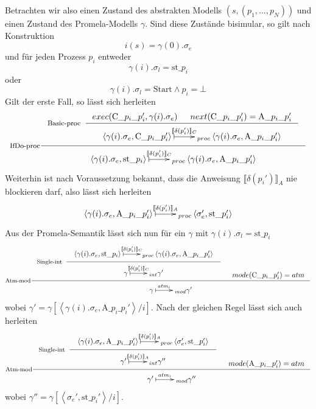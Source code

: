 Betrachten wir also einen Zustand des abstrakten Modells $(s,(p_1,\dots,p_N))$ und einen Zustand des Promela-Modells $\gamma$.
Sind diese Zustände bisimular, so gilt nach Konstruktion
\[ i(s) = \gamma(0).\sigma_e \]
und für jeden Prozess $p_i$ entweder
\[ \gamma(i).\sigma_l = \textrm{st\_}p_i \]
oder
\[ \gamma(i).\sigma_l = \textrm{Start} \land p_i = \bot \]
Gilt der erste Fall, so lässt sich herleiten
\[ \inference[IfDo-proc]{
  \inference[Basic-proc]{exec(\textrm{C\_}p_i\textrm{\_}p_i',\gamma(i).\sigma_e) & next(\textrm{C\_}p_i\textrm{\_}p_i') = \textrm{A\_}p_i\textrm{\_}p_i'}{
  \xymatrix{ \left<\gamma(i).\sigma_e,\textrm{C\_}p_i\textrm{\_}p_i'\right>\ar@{|->}[r]^-{\llbracket \delta(p_i')\rrbracket_C} & _{proc}
    \left<\gamma(i).\sigma_e,\textrm{A\_}p_i\textrm{\_}p_i'\right>}
  }
  }
  { \xymatrix{ \left<\gamma(i).\sigma_e,\textrm{st\_}p_i\right> \ar@{|->}[r]^-{\llbracket \delta(p_i')\rrbracket_C} & _{proc}
      \left<\gamma(i).\sigma_e,\textrm{A\_}p_i\textrm{\_}p_i'\right>}
  }
\]
Weiterhin ist nach Voraussetzung bekannt, dass die Anweisung $\llbracket \delta(p_i')\rrbracket_A$ nie blockieren darf, also lässt sich herleiten
\[
  \xymatrix{ \left<\gamma(i).\sigma_e,\textrm{A\_}p_i\textrm{\_}p_i'\right> \ar@{|->}[r]^-{\llbracket \delta(p_i')\rrbracket_A} & _{proc}
    \left<\sigma_e',\textrm{st\_}p_i'\right> }
\]
Aus der Promela-Semantik lässt sich nun für ein $\gamma$ mit $\gamma(i).\sigma_l = \textrm{st\_}p_i$
\[
\inference[Atm-mod]{
  \inference[Single-int]{
    \xymatrix{ \left<\gamma(i).\sigma_e,\textrm{st\_}p_i\right> \ar@{|->}[r]^-{\llbracket \delta(p_i')\rrbracket_C} & _{proc}
      \left<\gamma(i).\sigma_e,\textrm{A\_}p_i\textrm{\_}p_i'\right> }
  }{
    \xymatrix{ \gamma \ar@{|->}[r]^-{\llbracket \delta(p_i')\rrbracket_C} & _{int}
      \gamma'
    }
  } & mode(\textrm{C\_}p_i\textrm{\_}p_i') = atm
}{
  \xymatrix{ \gamma \ar@{|->}[r]^-{atm_i} & _{mod}
    \gamma'
  }
}
\]
wobei $\gamma' = \gamma[\left<\gamma(i).\sigma_e,\textrm{A\_}p_i\textrm{\_}p_i'\right>/i]$.
Nach der gleichen Regel lässt sich auch herleiten
\[
\inference[Atm-mod]{
  \inference[Single-int]{
    \xymatrix{ \left<\gamma(i).\sigma_e,\textrm{A\_}p_i\textrm{\_}p_i'\right> \ar@{|->}[r]^-{\llbracket \delta(p_i')\rrbracket_A} & _{proc}
      \left<\sigma_e',\textrm{st\_}p_i'\right> }
  }{
    \xymatrix{ \gamma'\ar@{|->}[r]^-{\llbracket \delta(p_i')\rrbracket_A} & _{int}
      \gamma''
    }
  } & mode(\textrm{A\_}p_i\textrm{\_}p_i') = atm
}{
  \xymatrix{ \gamma'\ar@{|->}[r]^-{atm_i} & _{mod}
    \gamma''
  }
}
\]
wobei $\gamma'' = \gamma[\left<\sigma_e',\textrm{st\_}p_i'\right>/i]$.
